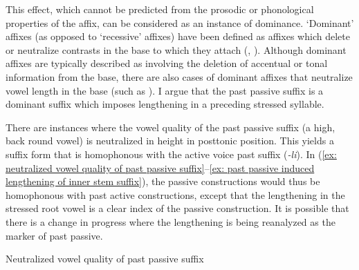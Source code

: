 This effect, which cannot be predicted from the prosodic or phonological properties of the affix, can be considered as an instance of dominance. `Dominant' affixes (as opposed to `recessive' affixes) have been defined as affixes which delete or neutralize contrasts in the base to which they attach (\citealt{kiparsky1982cyclic}, \citealt{inkelas1998theoretical}). Although dominant affixes are typically described as involving the deletion of accentual or tonal information from the base, there are also cases of dominant affixes that neutralize vowel length in the base (such as  \parencite{willardrainbow}). I argue that the past passive suffix is a dominant suffix which imposes lengthening in a preceding stressed syllable.

There are instances where the vowel quality of the past passive suffix (a high, back round vowel) is neutralized in height in posttonic position. This yields a suffix form that is homophonous with the active voice past suffix (\textit{-li}). In (\ref{ex: neutralized vowel quality of past passive suffix}--\ref{ex: past passive induced lengthening of inner stem suffix}), the passive constructions would thus be homophonous with past active constructions, except that the lengthening in the stressed root vowel is a clear index of the passive construction. It is possible that there is a change in progress where the lengthening is being reanalyzed as the marker of past passive.

\ea\label{ex: neutralized vowel quality of past passive suffix}
{Neutralized vowel quality of past passive suffix}

    \label{ex: neutralized vowel quality of past passive suffixa}
        \label{ex: neutralized vowel quality of past passive suffixb}
    \z
\z

